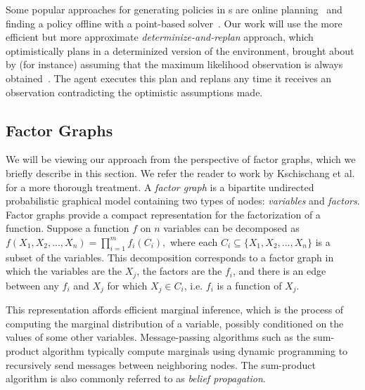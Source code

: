Some popular approaches for generating policies in \pomdp s are online
planning~\cite{pomcp,despot,beliefspaceplanning} and finding a policy
offline with a point-based solver~\cite{sarsop,pointpomdp}. Our work
will use the more efficient but more approximate
\emph{determinize-and-replan} approach, which optimistically plans in
a determinized version of the environment, brought about by (for
instance) assuming that the maximum likelihood observation is always
obtained~\cite{plattmlobs,bsptamp}. The agent executes this plan and
replans any time it receives an observation contradicting the
optimistic assumptions made.

\subsection{Factor Graphs}
We will be viewing our approach from the perspective of factor graphs,
which we briefly describe in this section. We refer the reader to work
by Kschischang et al.~\cite{factorgraph} for a more thorough treatment. A \emph{factor
  graph} is a bipartite undirected probabilistic graphical model
containing two types of nodes: \emph{variables} and
\emph{factors}. Factor graphs provide a compact representation for the
factorization of a function. Suppose a function $f$ on $n$ variables
can be decomposed as
$f(X_{1}, X_{2}, ..., X_{n}) = \prod_{i=1}^{m}f_{i}(C_{i}),$ where
each $C_{i} \subseteq \{X_{1}, X_{2}, ..., X_{n}\}$ is a subset of the
variables. This decomposition corresponds to a factor graph in which
the variables are the $X_{j}$, the factors are the $f_{i}$, and there
is an edge between any $f_{i}$ and $X_{j}$ for which
$X_{j} \in C_{i}$, i.e. $f_{i}$ is a function of $X_{j}$.

This representation affords efficient marginal inference, which is the
process of computing the marginal distribution of a variable, possibly
conditioned on the values of some other variables. Message-passing
algorithms such as the sum-product algorithm typically compute
marginals using dynamic programming to recursively send messages
between neighboring nodes. The sum-product algorithm is also commonly
referred to as \emph{belief propagation}.

